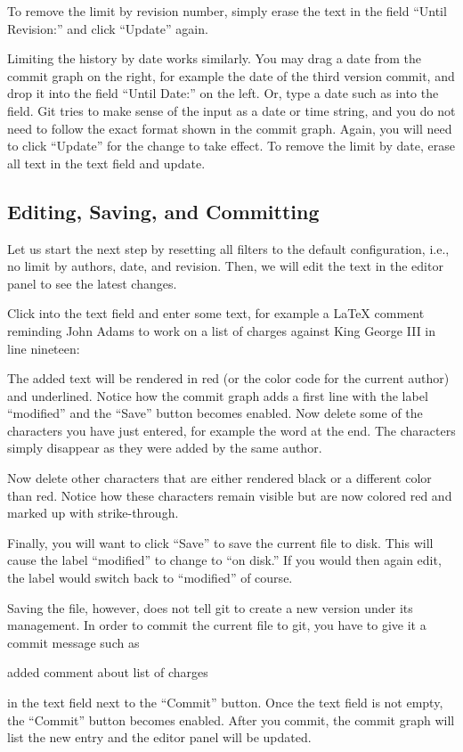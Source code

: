 To remove the limit by revision number, simply erase the text in the field ``Until Revision:'' and click ``Update'' again.

Limiting the history by date works similarly.  You may drag a date from the commit graph on the right, for example the date of the third version commit, and drop it into the field ``Until Date:'' on the left.  Or, type a date such as  into the field.  Git tries to make sense of the input as a date or time string, and you do not need to follow the exact format shown in the commit graph.  Again, you will need to click ``Update'' for the change to take effect.  To remove the limit by date, erase all text in the text field and update.

\subsection{Editing, Saving, and Committing}

Let us start the next step by resetting all filters to the default configuration, i.e., no limit by authors, date, and revision.  Then, we will edit the text in the editor panel to see the latest changes.

Click into the text field and enter some text, for example a LaTeX comment reminding John Adams to work on a list of charges against King George III in line nineteen:
\begin{CodeVerbatim}
\end{CodeVerbatim}
The added text will be rendered in red (or the color code for the current author) and underlined.  Notice how the commit graph adds a first line with the label ``modified'' and the ``Save'' button becomes enabled.  Now delete some of the characters you have just entered, for example the word  at the end.  The characters simply disappear as they were added by the same author.

Now delete other characters that are either rendered black or a different color than red.  Notice how these characters remain visible but are now colored red and marked up with strike-through.

Finally, you will want to click ``Save'' to save the current file to disk.  This will cause the label ``modified'' to change to ``on disk.''  If you would then again edit, the label would switch back to ``modified'' of course.

Saving the file, however, does not tell git to create a new version under its management.  In order to commit the current file to git, you have to give it a commit message such as 
\begin{CodeVerbatim}
added comment about list of charges
\end{CodeVerbatim}
in the text field next to the ``Commit'' button.  Once the text field is not empty, the ``Commit'' button becomes enabled.  After you commit, the commit graph will list the new entry and the editor panel will be updated.  

